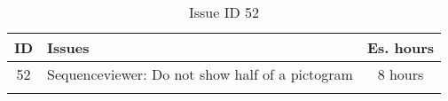 \begin{longtable} { | c | p{12cm} | c | } 
\hline
	ID 	&	Issues	&		 Es. hours \\\hline
	52 	&	Sequenceviewer: Do not show half of a pictogram	&	8 hours \\\hline
\caption{Issue ID 52}
\label{tab:spr3_SVnohalfpictograms}
\end{longtable}